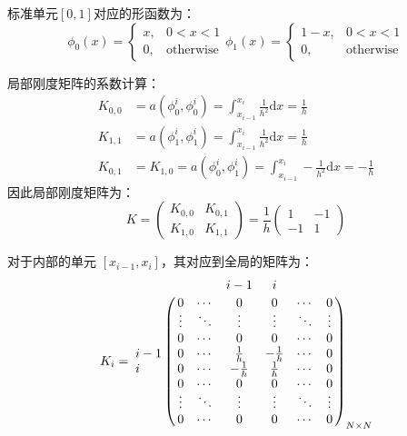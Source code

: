 \documentclass{ctexart}
\begin{document}
标准单元$[0, 1]$对应的形函数为：
\begin{equation}
    \phi_0 (x) = \begin{cases}
        x, & 0 < x < 1\\
        0, & \text{otherwise}
    \end{cases}
    \phi_1 (x) = \begin{cases}
        1-x, & 0 < x < 1\\
        0, & \text{otherwise}
    \end{cases}
\end{equation}

局部刚度矩阵的系数计算：
\begin{equation}
    \begin{aligned}
        K_{0, 0} &= a(\phi_0^i, \phi_0^i) = \int_{x_{i-1}}^{x_i} \frac{1}{h^2} \mathrm dx = \frac{1}{h}\\
        K_{1, 1} &= a(\phi_1^i, \phi_1^i) = \int_{x_{i-1}}^{x_i} \frac{1}{h^2} \mathrm dx = \frac{1}{h}\\
        K_{0, 1} &= K_{1, 0} = a(\phi_0^i, \phi_1^i) = \int_{x_{i-1}}^{x_i} -\frac{1}{h^2} \mathrm dx = -\frac{1}{h}
    \end{aligned}
\end{equation}
因此局部刚度矩阵为：
\begin{equation}
    K = \begin{pmatrix}
        K_{0, 0} & K_{0, 1}\\
        K_{1, 0} & K_{1, 1}
    \end{pmatrix} = \frac{1}{h} \begin{pmatrix}
        1 & -1\\ -1 & 1
    \end{pmatrix}
\end{equation}

对于内部的单元 $[x_{i-1}, x_{i}]$，其对应到全局的矩阵为：
\begin{equation}
    K_i = \bordermatrix{
    ~   & &  & i-1 & i \cr
    ~   & 0 & \cdots & 0 & 0 & \cdots & 0\cr
    ~   & \vdots & \ddots & \vdots & \vdots & \ddots & \vdots\cr
    ~   & 0 & \cdots & 0 & 0 & \cdots & 0\cr
    i-1 & 0 & \cdots & \frac{1}{h} & -\frac{1}{h}& \cdots & 0 \cr
    i & 0 & \cdots & -\frac{1}{h} & \frac{1}{h}& \cdots & 0 \cr
    ~   & 0 & \cdots & 0 & 0 & \cdots & 0\cr
    ~   & \vdots & \ddots & \vdots & \vdots & \ddots & \vdots\cr
    ~   & 0 & \cdots & 0 & 0 & \cdots & 0\cr}_{N \times N}
\end{equation}
\end{document}
